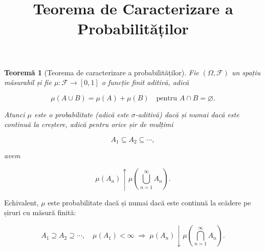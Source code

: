 \documentclass[12pt]{article}
\title{Teorema de Caracterizare a Probabilităților}
\author{}
\date{}
\theoremstyle{definition}
\theoremstyle{plain}
\newtheorem{theorem}{Teoremă}
\begin{document}
\maketitle

\begin{theorem}[Teorema de caracterizare a probabilităților]
Fie $(\Omega, \mathcal{F})$ un spațiu măsurabil și fie 
$\mu : \mathcal{F} \to [0,1]$ o funcție finit aditivă, adică


\[
    \mu(A \cup B) = \mu(A) + \mu(B)
    \quad \text{pentru } A \cap B = \varnothing.
\]


Atunci $\mu$ este o probabilitate (adică este $\sigma$-aditivă) dacă și numai dacă este continuă la creștere, adică pentru orice șir de mulțimi


\[
    A_1 \subseteq A_2 \subseteq \cdots,
\]


avem


\[
    \mu(A_n) \uparrow \mu\!\left( \bigcup_{n=1}^{\infty} A_n \right).
\]


\end{theorem}

\noindent
Echivalent, $\mu$ este probabilitate dacă și numai dacă este continuă la scădere pe șiruri cu măsură finită:


\[
    A_1 \supseteq A_2 \supseteq \cdots, \quad \mu(A_1) < \infty
    \;\Rightarrow\;
    \mu(A_n) \downarrow \mu\!\left( \bigcap_{n=1}^{\infty} A_n \right).
\]
\end{document}
